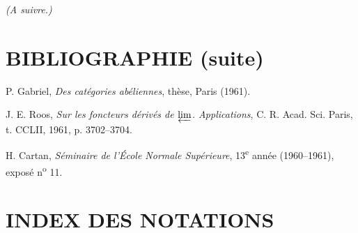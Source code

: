 \begin{flushright}
\emph{(A suivre.)}
\end{flushright}

\clearpage
\thispagestyle{empty}
\null
\clearpage
\thispagestyle{plain}

\section*{BIBLIOGRAPHIE (suite)}

\begin{flushleft}
[27] P. Gabriel, \emph{Des catégories abéliennes}, thèse, Paris (1961).

\medskip
[28] J. E. Roos, \emph{Sur les foncteurs dérivés de $\varprojlim$.
Applications}, C. R. Acad. Sci. Paris, t. CCLII, 1961, p. 3702--3704.

\medskip
[29] H. Cartan, \emph{Séminaire de l'École Normale Supérieure},
13\textsuperscript{e} année (1960--1961), exposé n\textsuperscript{o} 11.
\end{flushleft}

\clearpage
{}
\section*{INDEX DES NOTATIONS}


